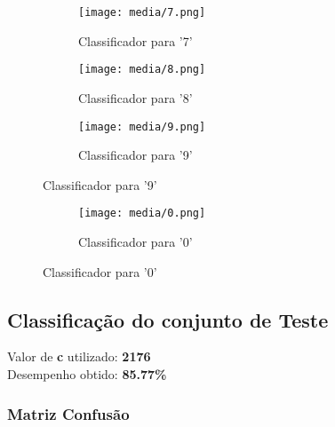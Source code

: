 \documentclass[a4paper]{article}
\begin{document}
\begin{figure}[H]
    \centering
    \begin{subfigure}{.33\textwidth}
        \centerline{\texttt{[image: media/7.png]}}
        \caption{Classificador para '7'}
        \label{fig:fig9}
    \end{subfigure}%
    \begin{subfigure}{.33\textwidth}
        \centerline{\texttt{[image: media/8.png]}}
        \caption{Classificador para '8'}
        \label{fig:fig10}
    \end{subfigure}%
    \begin{subfigure}{.33\textwidth}
        \centerline{\texttt{[image: media/9.png]}}
        \caption{Classificador para '9'}
        \label{fig:fig11}
    \end{subfigure}
\end{figure}

\begin{figure}[H]
    \centering
    \begin{subfigure}{.33\textwidth}
        \centerline{\texttt{[image: media/0.png]}}
        \caption{Classificador para '0'}
        \label{fig:fig12}
    \end{subfigure}%
\end{figure}


\subsection{Classificação do conjunto de Teste}

Valor de \textbf{c} utilizado: \textbf{2176} \\
Desempenho obtido: \textbf{85.77\%}

\subsubsection{Matriz Confusão}
\end{document}
